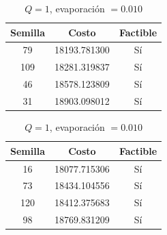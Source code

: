 \documentclass{article}
\begin{document}
    \begin{table}[H]
      \begin{minipage}{0.5\linewidth}
        \centering
        \caption{$Q=100$, evaporación $= 0.2$}
        \begin{tabular}{c c c}
          \hline
          Semilla & Costo & Factible \\
          \hline
          79      & 18193.781300 & Sí  \\
          109     & 18281.319837 & Sí  \\
          46      & 18578.123809 & Sí  \\
          31      & 18903.098012 & Sí  \\
        \end{tabular}
      \end{minipage}
      \begin{minipage}{0.5\linewidth}
        \centering
        \caption{$Q=1$, evaporación $= 0.010$}
        \begin{tabular}{c c c}
          \hline
          Semilla & Costo & Factible   \\
          \hline
          16      & 18077.715306 & Sí \\
          73      & 18434.104556 & Sí \\
          120     & 18412.375683 & Sí \\
          98      & 18769.831209 & Sí \\
        \end{tabular}
      \end{minipage}
    \end{table}
\end{document}
